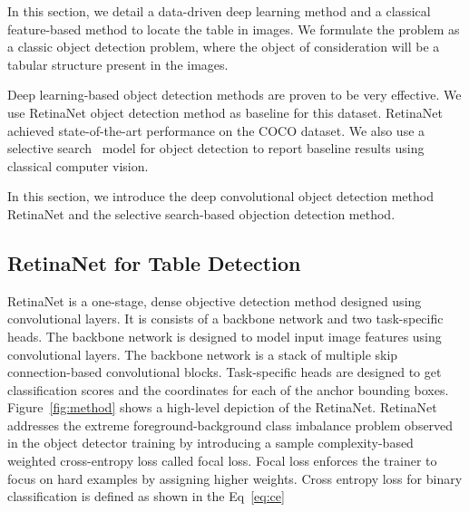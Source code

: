 \documentclass[a4paper,conference]{IEEEtran}
\begin{document}
In this section, we detail a data-driven deep learning method and a classical feature-based method to locate the table in images. We formulate the problem as a classic object detection problem, where the object of consideration will be a tabular structure present in the images. 

Deep learning-based object detection methods are proven to be very effective. We use RetinaNet \cite{retinanet} object detection method as baseline for this dataset.
RetinaNet achieved state-of-the-art performance on the COCO \cite{coco} dataset.  
We also use a selective search~\cite{ss} model for object detection to report baseline results using classical computer vision. 

In this section, we introduce the deep convolutional object detection method RetinaNet and the selective search-based objection detection method.



\subsection{RetinaNet for Table Detection}
RetinaNet is a one-stage, dense objective detection method designed using convolutional layers. It is consists of a backbone network and two task-specific heads. The backbone network is designed to model input image features using convolutional layers. The backbone network is a stack of multiple skip connection-based convolutional blocks. Task-specific heads are designed to get classification scores and the coordinates for each of the anchor bounding boxes. Figure~\ref{fig:method} shows a high-level depiction of the RetinaNet.
RetinaNet addresses the extreme foreground-background class imbalance problem observed in the object detector training by introducing a sample complexity-based weighted cross-entropy loss called focal loss. Focal loss enforces the trainer to focus on hard examples by assigning higher weights. 
Cross entropy loss for binary classification is defined as shown in the Eq~\ref{eq:ce}

 
\end{document}
